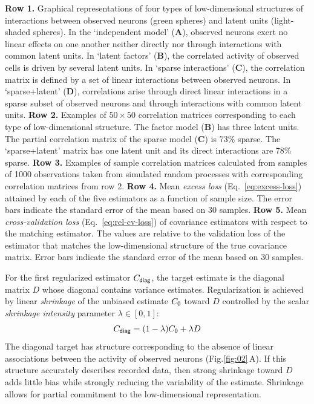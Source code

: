 \documentclass[10pt]{article}
\newcommand{\figref}[2]{Fig.\;\ref{fig:#1}\,#2}
\begin{document}
\begin{FPfigure}
{        {\bf Row 1.} Graphical representations of four types of low-dimensional structures of interactions between observed neurons (green spheres) and latent units (light-shaded spheres).
        In the `independent model' ({\bf A}), observed neurons exert no linear effects on one another neither directly nor through interactions with common latent units. 
        In `latent factors' ({\bf B}), the correlated activity of observed cells is driven by several latent units. 
        In `sparse interactions' ({\bf C}), the correlation matrix is defined by a set of linear interactions between observed neurons. 
        In `sparse+latent' ({\bf D}), correlations arise through direct linear interactions in a sparse subset of observed neurons and through interactions with common latent units. 
        {\bf Row 2.} Examples of $50\times 50$ correlation matrices corresponding to each type of low-dimensional structure. 
        The factor model ({\bf B}) has three latent units. 
        The partial correlation matrix of the sparse model ({\bf C}) is 73\% sparse.
        The `sparse+latent' matrix has one latent unit and its direct interactions are 78\% sparse.
        {\bf Row 3.} Examples of sample correlation matrices calculated from samples of 1000 observations taken from simulated random processes with corresponding correlation matrices from row 2.
        {\bf Row 4.} Mean \emph{excess loss} (Eq.~\ref{eq:excess-loss}) attained by each of the five estimators as a function of sample size. The error bars indicate the standard error of the mean based on 30 samples.
        {\bf Row 5.} Mean \emph{cross-validation loss} (Eq.~\ref{eq:rel-cv-loss}) of covariance estimators with respect to the matching estimator. The values are relative to the validation loss of the estimator that matches the low-dimensional structure of the true covariance matrix. Error bars indicate the standard error of the mean based on 30 samples.
    }
    \label{fig:02}
\end{FPfigure} 

For the first regularized estimator $C_{\sf diag}$, the target estimate is the diagonal matrix $D$ whose diagonal contains  variance estimates. Regularization is achieved by linear \emph{shrinkage} of the unbiased estimate $C_{\sf 0}$ toward $D$ controlled by the scalar \emph{shrinkage intensity} parameter $\lambda \in [0, 1]$:
\begin{equation}\label{eq:c-diag}
C_{\sf diag} = (1-\lambda) C_{\sf 0} + \lambda D
\end{equation}
The diagonal target has structure corresponding to the absence of linear associations between the activity of observed neurons (\figref{02}{A}).  If this structure accurately describes recorded data, then strong shrinkage toward $D$ adds little bias while strongly reducing the variability of the estimate. Shrinkage allows for partial commitment to the low-dimensional representation.  
\end{document}
